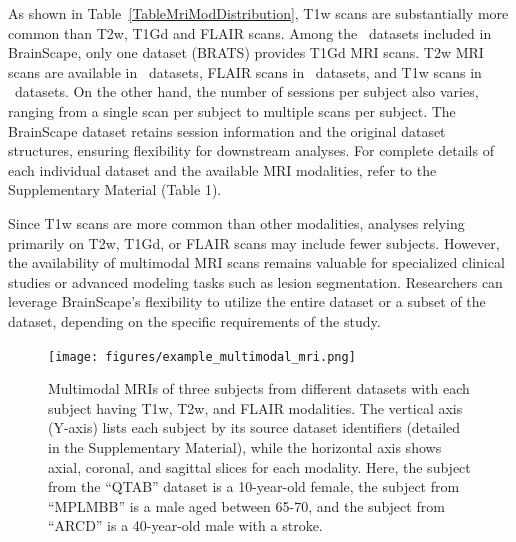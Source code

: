     
As shown in Table~\ref{TableMriModDistribution}, T1w scans are substantially more common than T2w, T1Gd and FLAIR scans.
Among the \NumDatasets\ datasets included in BrainScape, only one dataset (BRATS) provides T1Gd MRI scans. 
T2w MRI scans are available in \NumDatasetsWithTTwoScans\ datasets, 
FLAIR scans in \NumDatasetsWithTFlairScans\ datasets, 
and T1w scans in \NumDatasetsWithTToneScans\ datasets.
On the other hand, the number of sessions per subject also varies, 
ranging from a single scan per subject to multiple scans per subject. The BrainScape dataset 
retains session information and the original dataset structures, ensuring flexibility 
for downstream analyses. For complete details of each individual dataset and the available
MRI modalities, refer to the Supplementary Material (Table 1).

Since T1w scans are more common than other modalities, 
analyses relying primarily on T2w, T1Gd, or FLAIR scans may include fewer subjects. 
However, the availability of multimodal MRI scans remains valuable for specialized clinical studies or advanced modeling tasks such as lesion segmentation. 
Researchers can leverage BrainScape's flexibility to utilize the entire dataset or a subset of the dataset, depending on the specific requirements of the study.

\begin{figure}[ht]
    \centering
    \texttt{[image: figures/example\_multimodal\_mri.png]} 
    \caption{
        Multimodal MRIs of three subjects from different datasets with each subject having T1w, T2w, and FLAIR modalities. 
        The vertical axis (Y-axis) lists each subject by its source dataset identifiers (detailed in the Supplementary Material), 
        while the horizontal axis shows axial, coronal, and sagittal slices for each modality. 
        Here, the subject from the ``QTAB'' dataset is a 10-year-old female, 
        the subject from ``MPLMBB'' is a male aged between 65-70, 
        and the subject from ``ARCD'' is a 40-year-old male with a stroke. 
    }
    \label{fig:ExampleMultimodal}
\end{figure}

